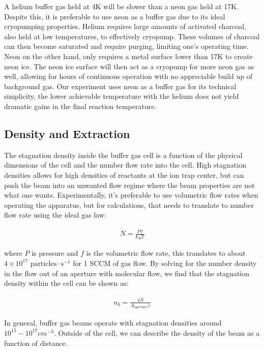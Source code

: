 \documentclass[a4paper]{article}
\begin{document}
A helium buffer gas held at 4K will be slower than a neon gas held at 17K. Despite this, it is preferable to use neon as a buffer gas due to its ideal cryopumping properties. Helium requires large amounts of activated charcoal, also held at low temperatures, to effectively cryopump. These volumes of charcoal can then become saturated and require purging, limiting one's operating time. Neon on the other hand, only requires a metal surface lower than 17K to create neon ice. The neon ice surface will then act as a cryopump for more neon gas as well, allowing for hours of continuous operation with no appreciable build up of background gas. Our experiment uses neon as a buffer gas for its technical simplicity, the lower achievable temperature with the helium does not yield dramatic gains in the final reaction temperature.

\subsection{Density and Extraction}

The stagnation density inside the buffer gas cell is a function of the physical dimensions of the cell and the number flow rate into the cell. High stagnation densities allows for high densities of reactants at the ion trap center, but can push the beam into an unwanted flow regime where the beam properties are not what one wants. Experimentally, it's preferable to use volumetric flow rates when operating the apparatus, but for calculations, that needs to translate to number flow rate using the ideal gas law:

\begin{align}
\dot{N} = \frac{P f}{k_B T}
\end{align}

where $P$ is pressure and $f$ is the volumetric flow rate, this translates to about $4\times10^{17} \text{ particles} \cdot \text{s}^{-1}$ for 1 SCCM of gas flow. By solving for the number density in the flow out of an aperture with molecular flow, we find that the stagnation density within the cell can be shown as:

\begin{align}
n_{b}=\frac{4 \dot{N}}{A_{aperture} \bar{v}}
\end{align}

In general, buffer gas beams operate with stagnation densities around $10^{15}-10^{17} cm^{-3}$. Outside of the cell, we can describe the density of the beam as a function of distance. \cite{Pauly}
\end{document}
